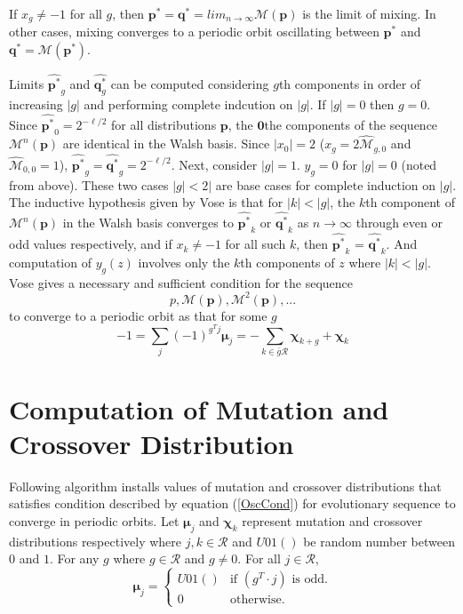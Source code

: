 If $x_g \neq −1$ for all $g$, then ${\bm p}^\ast = {\bm q}^\ast = lim_{n \rightarrow \infty} \mathcal{M}({\bm p})$ is the limit of mixing. In other cases, 
mixing converges to a periodic orbit oscillating between ${\bm p}^\ast$ and ${\bm q}^\ast = \mathcal{M}({\bm p}^\ast)$.

Limits $\widehat{{\bm p}^{\ast}}_g$ and $\widehat{{\bm q}^{\ast}_g}$ can be computed considering $g$th components in order of increasing $|g|$ and 
performing complete indcution on $|g|$. If $|g| = 0$ then $g = 0$. Since $\widehat{{\bm p}^\ast}_0 = 2^{-\ell/2}$ for all distributions ${\bm p}$, 
the $\textbf{0}$the components of the sequence $\mathcal{M}^n({\bm p})$ are identical in the Walsh basis. Since $|x_0| = 2$ ($x_g = 2\widehat{\mathcal{M}}_{g,0}$ 
and $\widehat{\mathcal{M}}_{0,0} = 1$), $\widehat{{\bm p}^{\ast}}_g = \widehat{{\bm q}^{\ast}}_g = 2^{-\ell/2}$. Next, consider $|g| = 1$. $y_g = 0$ for $|g| = 0$ 
(noted from above). These two cases $|g| < 2|$ are base cases for complete induction on $|g|$. The inductive hypothesis given by Vose is that 
for $|k| < |g|$, the $k$th component of $\mathcal{M}^n({\bm p})$ in the Walsh basis converges to $\widehat{{\bm p}^{\ast}}_k$ or $\widehat{{\bm q}^{\ast}}_k$ as 
$n \rightarrow \infty$ through even or odd values respectively, and if $x_k \neq -1$ for all such $k$, then 
$\widehat{{\bm p}^{\ast}}_k$ = $\widehat{{\bm q}^{\ast}}_k$. And computation of $y_g(z)$ involves only the $k$th components of $z$ where $|k| < |g|$. 
\newline 
Vose gives a necessary and sufficient condition for the sequence
\[
p, \mathcal{M}({\bm p}), \mathcal{M}^2({\bm p}),...
\]
to converge to a periodic orbit as that for some $g$
\begin{equation}
\label{OscCond}
-1 = \sum \limits_{j} (-1)^{g^T j} \bm{\mu}_j = - \sum \limits_{k \in \bar{g}\mathcal{R}} \bm{\chi}_{k+g} + \bm{\chi}_k
\end{equation}
 
\section{Computation of Mutation and Crossover Distribution}
Following algorithm installs values of mutation and crossover distributions that satisfies condition described 
by equation (\ref{OscCond}) for evolutionary sequence to converge in periodic orbits.
Let $\bm{\mu}_j$ and $\bm{\chi}_k$ represent mutation and crossover distributions respectively where $j,k \in \mathcal{R}$ 
and $U01()$ be random number between $0$ and $1$. For any $g$ where $g \in \mathcal{R}$ and $g \neq 0$.
For all $j \in \mathcal{R}$,
\[
\bm{\mu}_j = \begin{cases}
    U01() & \text{if $(g^T\cdot j)$ is odd}.\\
    0 & \text{otherwise}.
  \end{cases}
\]

